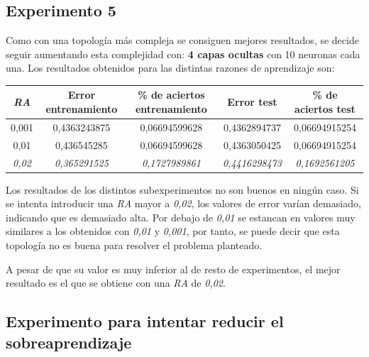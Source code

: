 \documentclass{uc3mpracticas}
\begin{document}
\subsection{Experimento 5}

Como con una topología más compleja se consiguen mejores resultados, se decide seguir aumentando esta complejidad con: \textbf{4 capas ocultas} con 10 neuronas cada una. Los resultados obtenidos para las distintas razones de aprendizaje son:

\begin{center}
  \begin{tabular}{|c|c|c|c|c|}
    \hline
    \rowcolor{Gray}
        \textit{\textbf{RA}}  & \textbf{Error entrenamiento} & \textbf{\% de aciertos entrenamiento} & \textbf{Error test} & \textbf{\% de aciertos test}\\ \hline
        0,001                 &  0,4363243875                &  0,06694599628                        &  0,4362894737       &  0,06694915254              \\ \hline
        0,01                  &  0,436545285                 &  0,06694599628                        &  0,4363050425       &  0,06694915254              \\ \hline
        \rowcolor{LightGreen}
        \textit{0,02}         &  \textit{0,365291525}        &  \textit{0,1727989861}                &  \textit{0,4416298473}&  \textit{0,1692561205}    \\ \hline

  \end{tabular}
\end{center}

Los resultados de los distintos subexperimentos no son buenos en ningún caso. Si se intenta introducir una \textit{RA} mayor a \textit{0,02}, los valores de error varían demasiado, indicando que es demasiado alta. Por debajo de \textit{0,01} se estancan en valores muy similares a los obtenidos con \textit{0,01} y \textit{0,001}, por tanto, se puede decir que esta topología no es buena para resolver el problema planteado.

\vspace{1mm}

A pesar de que su valor es muy inferior al de resto de experimentos, el mejor resultado es el que se obtiene con una \textit{RA} de \textit{0,02}.



\subsection{Experimento para intentar reducir el sobreaprendizaje}
\end{document}
